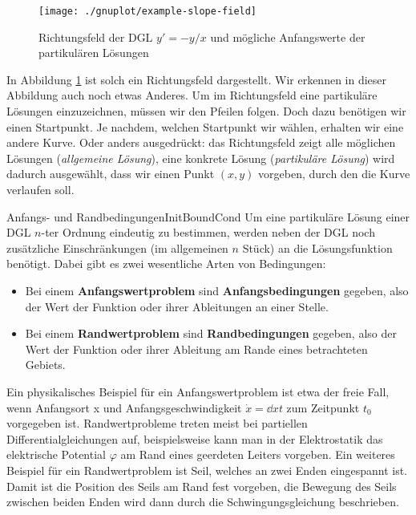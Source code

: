 \begin{figure}
    \centering
    \texttt{[image: ./gnuplot/example-slope-field]}
    \caption[Richtungsfeld einer DGL]{Richtungsfeld der DGL $y'=-y/x$ und mögliche Anfangswerte der partikulären Lösungen}
    \label{fig:ExSlopField}
\end{figure}

In Abbildung \ref{fig:ExSlopField} ist solch ein Richtungsfeld dargestellt. Wir erkennen in dieser Abbildung auch noch etwas Anderes. Um im Richtungsfeld eine partikuläre Lösungen einzuzeichnen, müssen wir den Pfeilen folgen. Doch dazu benötigen wir einen Startpunkt. Je nachdem, welchen Startpunkt wir wählen, erhalten wir eine andere Kurve. Oder anders ausgedrückt: das Richtungsfeld zeigt alle möglichen Lösungen (\emph{allgemeine Lösung}), eine konkrete Lösung (\emph{partikuläre Lösung}) wird dadurch ausgewählt, dass wir einen Punkt $(x,y)$ vorgeben, durch den die Kurve verlaufen soll.

\begin{definition}{Anfangs- und Randbedingungen}{InitBoundCond}
    Um eine partikuläre Lösung einer DGL $n$-ter Ordnung eindeutig zu bestimmen, werden neben der DGL noch zusätzliche Einschränkungen (im allgemeinen $n$ Stück) an die Lösungsfunktion benötigt. Dabei gibt es zwei wesentliche Arten von Bedingungen:
    \begin{itemize}
        \item Bei einem \textbf{Anfangswertproblem} sind \textbf{Anfangsbedingungen} gegeben, also der Wert der Funktion oder ihrer Ableitungen an einer Stelle.
        \item Bei einem \textbf{Randwertproblem} sind \textbf{Randbedingungen} gegeben, also der Wert der Funktion oder ihrer Ableitung am Rande eines betrachteten Gebiets.
    \end{itemize}
\end{definition}

Ein physikalisches Beispiel für ein Anfangswertproblem ist etwa der freie Fall, wenn Anfangsort x und Anfangsgeschwindigkeit $\dot{x} = \dd{x}{t}$ zum Zeitpunkt $t_0$ vorgegeben ist. Randwertprobleme treten meist bei partiellen Differentialgleichungen auf, beispielsweise kann man in der Elektrostatik das elektrische Potential $\varphi$ am Rand eines geerdeten Leiters vorgeben. Ein weiteres Beispiel für ein Randwertproblem ist Seil, welches an zwei Enden eingespannt ist. Damit ist die Position des Seils am Rand fest vorgeben, die Bewegung des Seils zwischen beiden Enden wird dann durch die Schwingungsgleichung beschrieben.


